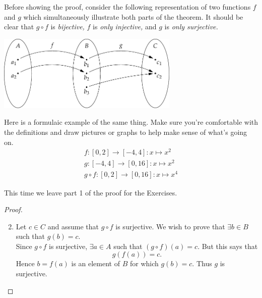  Before showing the proof, consider the following representation of two functions $f$ and $g$ which simultaneously illustrate both parts of the theorem. It should be clear that $g\circ f$ is \emph{bijective,} $f$ is \emph{only injective,} and $g$ is \emph{only surjective.}

\begin{center}
\includegraphics[width=0.65\textwidth]{sets-17-injcomp}
\end{center}

 Here is a formulaic example of the same thing. Make sure you're comfortable with the definitions and draw pictures or graphs to help make sense of what's going on.
\begin{gather*}
f:[0,2]\to[-4,4]:x\mapsto x^2\tag*{(injective only)}\\[5pt]
g:[-4,4]\to [0,16]:x\mapsto x^2\tag*{(surjective only)}\\[5pt]
g\circ f:[0,2]\to[0,16]:x\mapsto x^4\tag*{(bijective!)}
\end{gather*}


 This time we leave part 1 of the proof for the Exercises.
\begin{proof}
\begin{enumerate}\setcounter{enumi}{1}
  \item Let $c\in C$ and assume that $g\circ f$ is surjective. We wish to prove that $\exists b\in B$ such that $g(b)=c$.\\
  Since $g\circ f$ is surjective, $\exists a\in A$ such that $(g\circ f)(a)=c$. But this says that
  \[g(f(a))=c.\]
  Hence $b=f(a)$ is an element of $B$ for which $g(b)=c$. Thus $g$ is surjective.\qedhere
\end{enumerate}
\end{proof}

